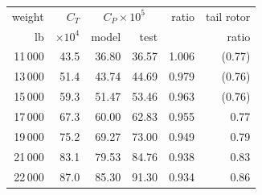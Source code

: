 \begin{tabular}{@{}rrrrrr@{}}
\toprule
weight & $C_T$ & \multicolumn{2}{c}{$C_P\times10^5$} & ratio & tail rotor \\
lb & $\times10^4$ & model & test & & ratio \\
\midrule
11\,000 & 43.5 & 36.80 & 36.57 & 1.006 & (0.77) \\
13\,000 & 51.4 & 43.74 & 44.69 & 0.979 & (0.76) \\
15\,000 & 59.3 & 51.47 & 53.46 & 0.963 & (0.76) \\
17\,000 & 67.3 & 60.00 & 62.83 & 0.955 & 0.77 \\
19\,000 & 75.2 & 69.27 & 73.00 & 0.949 & 0.79 \\
21\,000 & 83.1 & 79.53 & 84.76 & 0.938 & 0.83 \\
22\,000 & 87.0 & 85.30 & 91.30 & 0.934 & 0.86 \\
\bottomrule
\end{tabular}
